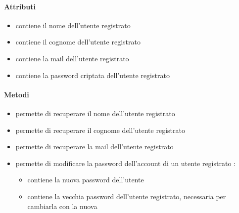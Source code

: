 \paragraph{Attributi}
\begin{itemize}
\item {}
\newline
contiene il nome dell'utente registrato
\item {}
\newline
contiene il cognome dell'utente registrato
\item {}
\newline
contiene la mail dell'utente registrato
\item {}
\newline
contiene la password criptata dell'utente registrato
\end{itemize}
\paragraph{Metodi}
\begin{itemize}
\item {}
\newline
permette di recuperare il nome dell'utente registrato
\newline
\item {}
\newline
permette di recuperare il cognome dell'utente registrato
\newline
\item {}
\newline
permette di recuperare la mail dell'utente registrato
\newline
\item {}
\newline
permette di modificare la password dell'account di un utente registrato
\newline
{} :
\begin{itemize}
\item {}
\newline
contiene la nuova password dell'utente
\item {}
\newline
contiene la vecchia password dell'utente registrato, necessaria per cambiarla con la nuova
\end{itemize}
\end{itemize}

